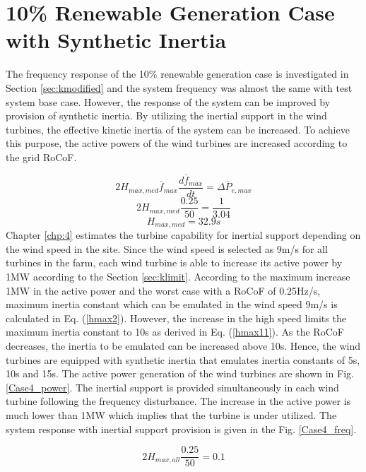 \section{10\% Renewable Generation Case with Synthetic Inertia}
The frequency response of the 10\% renewable generation case is investigated in Section \ref{sec:kmodified} and the system frequency was almost the same with test system base case. However, the response of the system can be improved by provision of synthetic inertia. By utilizing the inertial support in the wind turbines, the effective kinetic inertia of the system can be increased. To achieve this purpose, the active powers of the wind turbines are increased according to the grid RoCoF. \par
\begin{equation}
\label{hmax}
2H_{max,med}\overline{f}_{max}\frac{d\overline{f}_{max}}{dt}=\Delta\overline{P}_{e,max}
\end{equation}
\begin{equation}
\label{hmax1}
2H_{max,med}\frac{0.25}{50}=\frac{1}{3.04}
\end{equation}
\begin{equation}
\label{hmax2}
H_{max,med}=32.9s
\end{equation}
Chapter \ref{chp:4} estimates the turbine capability for inertial support depending on the wind speed in the site. Since the wind speed is selected as 9m/s for all turbines in the farm, each wind turbine is able to increase its active power by 1MW according to the Section \ref{sec:klimit}. According to the maximum increase 1MW in the active power and the worst case with a RoCoF of 0.25Hz/s, maximum inertia constant which can be emulated in the wind speed 9m/s is calculated in Eq. (\ref{hmax2}). However, the increase in the high speed limits the maximum inertia constant to 10s as derived in Eq. (\ref{hmax11}). As the RoCoF decreases, the inertia to be emulated can be increased above 10s. Hence, the wind turbines are equipped with synthetic inertia that emulates inertia constants of 5s, 10s and 15s. The active power generation of the wind turbines are shown in Fig. \ref{Case4_power}. The inertial support is provided simultaneously in each wind turbine following the frequency disturbance. The increase in the active power is much lower than 1MW which implies that the turbine is under utilized. The system response with inertial support provision is given in the Fig. \ref{Case4_freq}.\par
\begin{equation}
\label{hmax11}
2H_{max,all}\frac{0.25}{50}=0.1
\end{equation}
